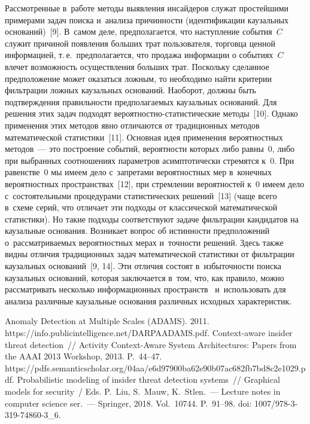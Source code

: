 \begin{multicols}{2}
  Рассмотренные в~работе методы выявления инсайдеров служат простейшими 
примерами задач поиска и~анализа причинности (идентификации каузальных 
оснований)~[9]. В~самом деле, предполагается, что наступление события~$C$ 
служит причиной появления больших трат пользователя, торговца ценной 
информацией, т.\,е.\ предполагается, что продажа информации о 
событиях~$C$ влечет возможность осуществления больших трат. Поскольку 
сделанное предположение может оказаться ложным, то необходимо найти 
критерии фильтрации ложных каузальных оснований. Наоборот, должны быть 
подтверждения правильности предполагаемых каузальных оснований. Для 
решения этих задач подходят ве\-ро\-ят\-ност\-но-ста\-ти\-сти\-че\-ские 
методы~[10]. Однако применения этих методов явно отличаются от 
традиционных методов математической статистики~[11]. Основная идея 
применения вероятностных методов~--- это построение событий, вероятности 
которых либо равны~0, либо при выбранных соотношениях параметров 
асимптотически стремятся к~0. При равенстве~0 мы имеем дело с~запретами 
вероятностных мер в~конечных вероятностных пространствах~[12], при 
стремлении вероятностей к~0 имеем дело с~состоятельными процедурами 
статистических решений~[13] (чаще всего в~схеме серий, что отличает эти 
подходы от классической математической статистики). Но такие подходы 
соответствуют задаче фильтрации кандидатов на каузальные основания. 
Возникает вопрос об истинности предположений  
о~рас\-смат\-ри\-ва\-емых вероятностных мерах и~точности решений. Здесь 
также видны отличия традиционных задач математической статистики от 
фильтрации каузальных оснований~[9, 14]. Эти отличия состоят в~избыточности 
поиска каузальных оснований, которая заключается в~том, что, как правило, 
можно рассматривать несколько информационных пространств~\cite{8-gr} 
и~использовать для анализа различные каузальные основания различных исходных 
характеристик. 
  
{\small\frenchspacing
 {%
 \begin{thebibliography}{99}
  
Anomaly Detection at Multiple Scales (ADAMS). 2011. {\sf 
https://info.publicintelligence.net/DARPAADAMS.pdf}.
 Context-aware insider threat detection~// Activity 
Context-Aware System Architectures: Papers from the AAAI 2013 Workshop, 2013. P.~44--47.
{\sf 
https://pdfs.semanticscholar.org/\linebreak 04aa/e6d97900ba62e90b07ac682fb7bd8c2e1029.pdf}.
Probabilistic modeling of insider threat detection systems~// Graphical 
models for security~/
Eds. P.~Liu, S.~Mauw, K.~\mbox{St{\!\ptb{\o}}len}.~--- Lecture notes in computer science  ser.~--- Springer, 2018. 
Vol.~10744. P.~91--98. doi:  
1007/978-3-319-74860-3\_6.


\end{thebibliography}}}
\end{multicols}
